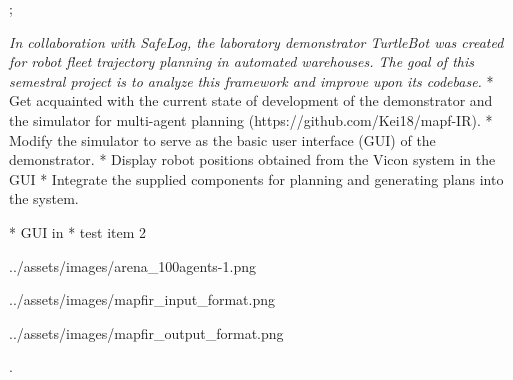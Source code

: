 

\worktype[B/EN]
\slideshow



\pg;


\textit {
    In collaboration with SafeLog, the laboratory demonstrator TurtleBot was created
    for robot fleet trajectory planning in automated warehouses. The goal of this semestral
    project is to analyze this framework and improve upon its codebase.
}
\begitems
* Get acquainted with the current state of development of the demonstrator and the simulator for multi-agent planning (https://github.com/Kei18/mapf-IR).
* Modify the simulator to serve as the basic user interface (GUI) of the demonstrator.
* Display robot positions obtained from the Vicon system in the GUI
* Integrate the supplied components for planning and generating plans into the system.
\enditems
\nl


\begin{table}
    
\end{table}



\begitems
* GUI in 
* test item 2
\enditems
\nl

\centerline{\picw=14cm \inspic ../assets/images/arena_100agents-1.png }

\sec 

\centerline{\picw=5cm \inspic ../assets/images/mapfir_input_format.png }
\centerline{\picw=5cm \inspic ../assets/images/mapfir_output_format.png }


\pg.